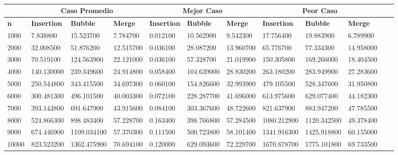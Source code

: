 \begin{table}[!ht]
\centering
\begin{tabular}{|l|l|l|l|l|l|l|l|l|l|l|l|}\hline
 &\multicolumn{3}{c|}{\textbf{Caso Promedio}}&\multicolumn{3}{c|}{\textbf{Mejor Caso}}&\multicolumn{3}{c|}{\textbf{Peor Caso}}\\\hline
\textbf{n}&\textbf{Insertion}&\textbf{Bubble}&\textbf{Merge}&\textbf{Insertion}&\textbf{Bubble}&\textbf{Merge}&\textbf{Insertion}&\textbf{Bubble}&\textbf{Merge}\\\hline
1000&7.838800&15.523700&7.784700&0.012100&10.562900&9.542300&17.756400&19.883900&6.789900\\\hline
2000&32.008500&51.876200&12.515700&0.036100&28.087200&13.960700&65.776700&77.334300&14.958000\\\hline
3000&70.519100&124.563900&22.121000&0.036100&57.328700&21.019900&150.305800&169.266000&18.404500\\\hline
4000&140.130000&239.349600&24.914800&0.058400&104.639000&28.830200&263.180200&283.949900&27.283600\\\hline
5000&250.544800&343.415500&34.697300&0.060100&154.826600&32.993900&479.105500&528.347600&31.950800\\\hline
6000&300.481300&496.101500&40.003300&0.072100&228.287700&41.696000&613.975600&629.077400&44.182300\\\hline
7000&393.143800&691.647900&43.915600&0.084100&303.367600&48.722600&821.637900&883.947200&47.785500\\\hline
8000&524.866300&898.483400&57.228700&0.163400&398.766800&57.284500&1080.212900&1120.342500&49.378400\\\hline
9000&674.446900&1109.034100&57.370300&0.111500&500.723800&58.101400&1341.916300&1425.918800&60.155000\\\hline
10000&823.523200&1362.475900&70.694100&0.120000&629.093600&72.229700&1670.878700&1775.101800&69.733500\\\hline
\end{tabular}
\caption{}
\end{table}